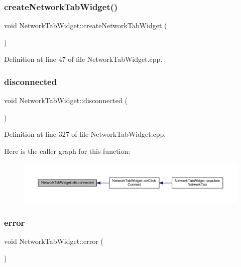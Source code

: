 \subsubsection{\texorpdfstring{create\+Network\+Tab\+Widget()}{createNetworkTabWidget()}}
{\footnotesize\ttfamily void Network\+Tab\+Widget\+::create\+Network\+Tab\+Widget (\begin{DoxyParamCaption}{ }\end{DoxyParamCaption})}



Definition at line 47 of file Network\+Tab\+Widget.\+cpp.

\mbox{\label{class_network_tab_widget_a70744044832e441549355ff37cc9e47c}} 
\subsubsection{\texorpdfstring{disconnected}{disconnected}}
{\footnotesize\ttfamily void Network\+Tab\+Widget\+::disconnected (\begin{DoxyParamCaption}{ }\end{DoxyParamCaption})\hspace{0.3cm}{\ttfamily [slot]}}



Definition at line 327 of file Network\+Tab\+Widget.\+cpp.

Here is the caller graph for this function\+:
\nopagebreak
\begin{figure}[H]
\begin{center}
\leavevmode
\includegraphics[width=350pt]{class_network_tab_widget_a70744044832e441549355ff37cc9e47c_icgraph}
\end{center}
\end{figure}
\mbox{\label{class_network_tab_widget_ac1f26cd8a5af5253be312be5fc56c2ad}} 
\subsubsection{\texorpdfstring{error}{error}}
{\footnotesize\ttfamily void Network\+Tab\+Widget\+::error (\begin{DoxyParamCaption}\item[{Q\+Abstract\+Socket\+::\+Socket\+Error}]{ }\end{DoxyParamCaption})\hspace{0.3cm}{\ttfamily [slot]}}



